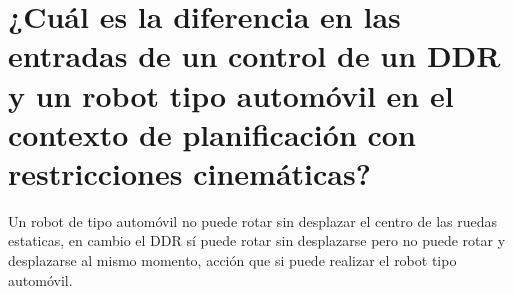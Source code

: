 \section{¿Cuál es la diferencia en las entradas de un control de un DDR y un robot tipo automóvil en el contexto de planificación con restricciones cinemáticas?}
Un robot de tipo automóvil no puede rotar sin desplazar el centro de las ruedas estaticas, en cambio el DDR sí puede rotar sin desplazarse pero no puede rotar y desplazarse al mismo momento, acción que si puede realizar el robot tipo automóvil.
